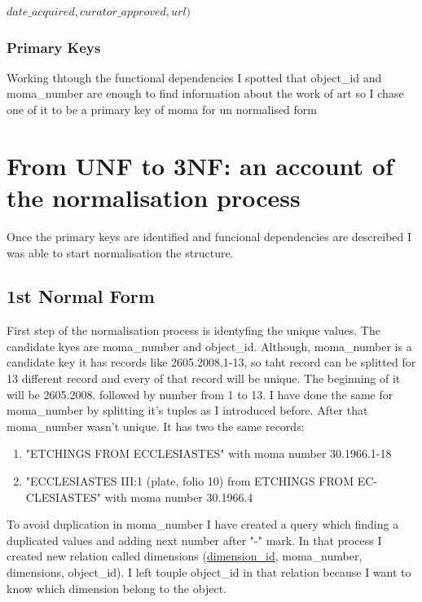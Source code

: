 \documentclass[journal,transmag]{IEEEtran}
\begin{document}
$date\_acquired, curator\_approved, url)$
\newline

\subsubsection {Primary Keys}

Working thtough the functional dependencies I spotted that object\_id and moma\_number are enough to find information about the work of art so I chase one of it to be a primary key of moma for un normalised form

\section {From UNF to 3NF: an account of the normalisation process}

Once the primary keys are identified and funcional dependencies are descreibed I was able to start normalisation the structure. 

\subsection {1st Normal Form}

First step of the normalisation process is identyfing the unique values. The candidate kyes are moma\_number and object\_id. Although, moma\_number is a candidate key it has records like 2605.2008.1-13, so taht record can be splitted for 13 different record and every of that record will be unique. The beginning of it will be 2605.2008. followed by number from 1 to 13. 
I have done the same for moma\_number by splitting it's tuples as I introduced before. After that moma\_number wasn't unique. It has two the same records:
\newline
\begin{enumerate}
\item "ETCHINGS FROM ECCLESIASTES" with moma number 30.1966.1-18
\item "ECCLESIASTES III:1 (plate, folio 10) from ETCHINGS FROM EC-CLESIASTES" with moma number 30.1966.4
\end{enumerate}

To avoid duplication in moma\_number I have created a query which finding a duplicated values and adding next number after "-" mark. In that process I created new relation called dimensions (\underline{dimension\_id}, moma\_number, dimensions, object\_id). I left touple object\_id in that relation because I want to know which dimension belong to the object. 
\newline
\end{document}
